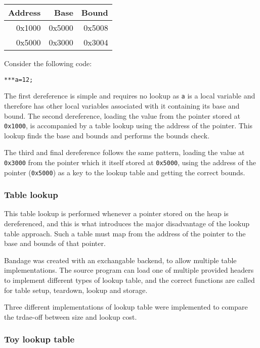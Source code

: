 \noindent
\begin{tabular}{|r|r|r|}
\hline Address & Base & Bound \\
\hline 0x1000 & 0x5000 & 0x5008 \\
\hline 0x5000 & 0x3000 & 0x3004 \\
\hline
\end{tabular}

Consider the following code:

\begin{verbatim}
***a=12;
\end{verbatim}

The first dereference is simple and requires no lookup as \verb!a! is a local variable and therefore has other local variables associated with it containing its base and bound.
The second dereference, loading the value from the pointer stored at \verb!0x1000!, is accompanied by a table lookup using the address of the pointer.
This lookup finds the base and bounds and performs the bounds check.

The third and final dereference follows the same pattern, loading the value at \verb!0x3000! from the pointer which it itself stored at \verb!0x5000!, using the address of the pointer (\verb!0x5000!) as a key to the lookup table and getting the correct bounds.

\subsubsection{Table lookup}

This table lookup is performed whenever a pointer stored on the heap is dereferenced, and this is what introduces the major disadvantage of the lookup table approach.
Such a table must map from the address of the pointer to the base and bounds of that pointer.

Bandage was created with an exchangable backend, to allow multiple table implementations.
The source program can load one of multiple provided headers to implement different types of lookup table, and the correct functions are called for table setup, teardown, lookup and storage.

Three different implementations of lookup table were implemented to compare the trdae-off between size and lookup cost.

\subsubsection{Toy lookup table}

